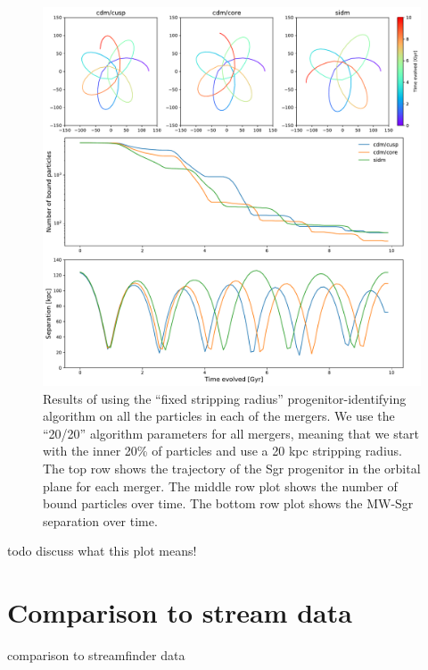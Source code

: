 \begin{figure}
    \centering
    \includegraphics[width=0.9\linewidth]{figs/all_mergers_pretty.pdf}
    \caption{%
        Results of using the ``fixed stripping radius'' progenitor-identifying
        algorithm on all the particles in each of the mergers. We use the
        ``20/20'' algorithm parameters for all mergers, meaning that we start
        with the inner 20\% of particles and use a 20 kpc stripping radius. The
        top row shows the trajectory of the Sgr progenitor in the orbital plane
        for each merger. The middle row plot shows the number of bound particles
        over time. The bottom row plot shows the MW-Sgr separation over time.
    }
    \label{fig:all}
\end{figure}

todo discuss what this plot means!

\hypertarget{comparison-to-stream-data}{%
\section{Comparison to stream data}\label{comparison-to-stream-data}}

comparison to streamfinder data
